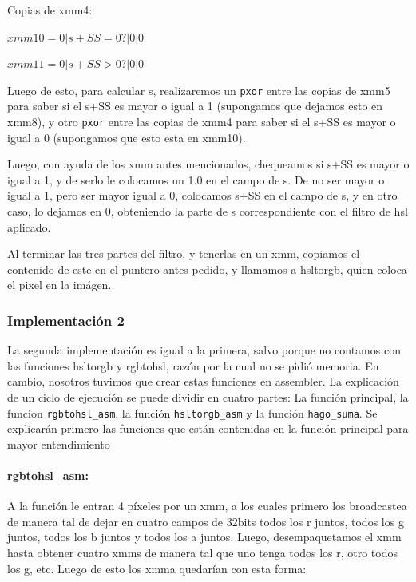 \documentclass[a4paper]{article}
\begin{document}
\vspace*{0.3cm}

Copias de xmm4:

\vspace*{0.3cm}

$xmm10= 0 |s+SS= 0?| 0 | 0$

\vspace*{0.3cm}

$xmm11= 0 |s+SS > 0?| 0 | 0$

\vspace*{0.3cm}

Luego de esto, para calcular s, realizaremos un {\tt pxor} entre las copias de xmm5 para saber si el s+SS es mayor o igual a 1 (supongamos que dejamos esto en xmm8), y otro {\tt pxor} entre las copias de xmm4 para saber si el s+SS es mayor o igual a 0 (supongamos que esto esta en xmm10).

Luego, con ayuda de los xmm antes mencionados, chequeamos si s+SS es mayor o igual a 1, y de serlo le colocamos un 1.0 en el campo de s. De no ser mayor o igual a 1, pero ser mayor igual a 0, colocamos s+SS en el campo de s, y en otro caso, lo dejamos en 0, obteniendo la parte de s correspondiente con el filtro de hsl aplicado. 

Al terminar las tres partes del filtro, y tenerlas en un xmm, copiamos el contenido de este en el puntero antes pedido, y llamamos a hsltorgb, quien coloca el pixel en la imágen.

\subsubsection{Implementación 2}
La segunda implementación es igual a la primera, salvo porque no contamos con las funciones hsltorgb y rgbtohsl, razón por la cual no se pidió memoria. En cambio, nosotros tuvimos que crear estas funciones en assembler. La explicación de un ciclo de ejecución se puede dividir en cuatro partes: La función principal, la funcion {\tt rgbtohsl\_asm}, la función {\tt hsltorgb\_asm} y la función {\tt hago\_suma}. Se explicarán primero las funciones que están contenidas en la función principal para mayor entendimiento

\paragraph*{rgbtohsl_asm:}

A la función le entran 4 píxeles por un xmm, a los cuales primero los broadcastea de manera tal de dejar en cuatro campos de 32bits todos los r juntos, todos los g juntos, todos los b juntos y todos los a juntos. Luego, desempaquetamos el xmm hasta obtener cuatro xmms de manera tal que uno tenga todos los r, otro todos los g, etc. Luego de esto los xmma quedarían con esta forma:
\end{document}
